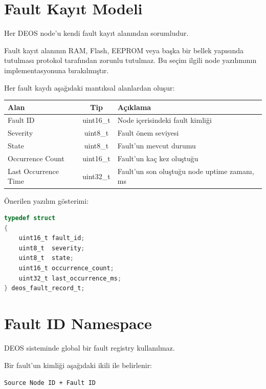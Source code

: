 \documentclass[a4paper,11pt]{article}
\begin{document}
\section{Fault Kayıt Modeli}

Her DEOS node'u kendi fault kayıt alanından sorumludur.

Fault kayıt alanının RAM, Flash, EEPROM veya başka bir bellek yapısında
tutulması protokol tarafından zorunlu tutulmaz.
Bu seçim ilgili node yazılımının implementasyonuna bırakılmıştır.

Her fault kaydı aşağıdaki mantıksal alanlardan oluşur:

\begin{center}
\begin{tabular}{l c l}
\toprule
\textbf{Alan} & \textbf{Tip} & \textbf{Açıklama} \\
\midrule
Fault ID &
uint16\_t &
Node içerisindeki fault kimliği \\

Severity &
uint8\_t &
Fault önem seviyesi \\

State &
uint8\_t &
Fault'un mevcut durumu \\

Occurrence Count &
uint16\_t &
Fault'un kaç kez oluştuğu \\

Last Occurrence Time &
uint32\_t &
Fault'un son oluştuğu node uptime zamanı, ms \\
\bottomrule
\end{tabular}
\end{center}

Önerilen yazılım gösterimi:

\begin{lstlisting}[language=C]
typedef struct
{
    uint16_t fault_id;
    uint8_t  severity;
    uint8_t  state;
    uint16_t occurrence_count;
    uint32_t last_occurrence_ms;
} deos_fault_record_t;
\end{lstlisting}

\section{Fault ID Namespace}

DEOS sisteminde global bir fault registry kullanılmaz.

Bir fault'un kimliği aşağıdaki ikili ile belirlenir:

\begin{center}
\texttt{Source Node ID + Fault ID}
\end{center}
\end{document}
